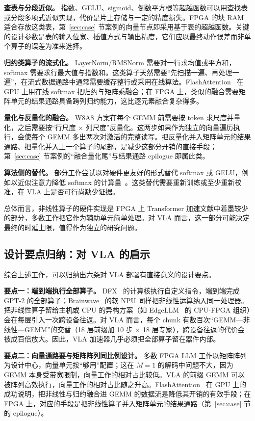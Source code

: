 \documentclass[a4paper,10.5pt]{ctexart}
\begin{document}
\textbf{查表与分段近似。} 指数、GELU、sigmoid、倒数平方根等超越函数可以用查找表或分段多项式近似实现，代价是片上存储与一定的精度损失。FPGA 的块 RAM 适合存放这类表，第~\ref{sec:case} 节案例的向量节点即采用基于表的超越函数。关键的设计参数是表的输入位宽、插值方式与输出精度，它们应以最终动作误差而非单个算子的误差为准来选择。

\textbf{归约类算子的流式化。} LayerNorm/RMSNorm 需要对一行求均值或平方和，softmax 需要求行最大值与指数和。这类算子天然需要“先扫描一遍、再处理一遍”，在流式数据通路中通常需要缓存整行或采用在线算法。FlashAttention~\cite{flashattn} 在 GPU 上用在线 softmax 把归约与矩阵乘融合；在 FPGA 上，类似的融合需要矩阵单元的结果通路具备跨列归约能力，这比逐元素融合复杂得多。

\textbf{量化与反量化的融合。} W8A8 方案在每个 GEMM 前需要按 token 求尺度并量化，之后需要按“行尺度 $\times$ 列尺度”反量化。这两步如果作为独立的向量遍历执行，会使每个 GEMM 多出两次对激活的完整读写。把反量化并入矩阵单元的结果通路、把量化并入上一个算子的尾部，是减少这部分开销的直接手段；第~\ref{sec:case} 节案例的“融合量化尾”与结果通路 epilogue 即属此类。

\textbf{算法侧的替代。} 部分工作尝试以对硬件更友好的形式替代 softmax 或 GELU，例如以近似注意力降低 softmax 的计算量~\cite{a3,elsa}。这类替代需要重新训练或至少重新校准，在 VLA 上是否可行尚缺少证据。

总体而言，非线性算子的硬件实现是 FPGA 上 Transformer 加速文献中着墨较少的部分，多数工作把它作为辅助单元简单处理。对 VLA 而言，这一部分可能决定最终的时延上限，值得作为独立的研究问题。

\subsection{设计要点归纳：对 VLA 的启示}\label{sec:lessons}

综合上述工作，可以归纳出六条对 VLA 部署有直接意义的设计要点。

\textbf{要点一：端到端执行全部算子。} DFX~\cite{dfx} 的计算核执行自定义指令，端到端完成 GPT-2 的全部算子；Brainwave~\cite{brainwave} 的软 NPU 同样把非线性运算纳入同一处理器。把非线性算子留给主机或 CPU 的异构方案（如 EdgeLLM~\cite{edgellm} 的 CPU-FPGA 组织）会在每层引入一次跨设备往返。对 VLA 而言，每个 chunk 有数百次“GEMM—非线性—GEMM”的交替（18 层前缀加 10 步 $\times$ 18 层专家），跨设备往返的代价会被成百倍放大。因此，VLA 加速器几乎必须把全部算子留在器件内部。

\textbf{要点二：向量通路要与矩阵阵列同比例设计。} 多数 FPGA LLM 工作以矩阵阵列为设计中心，向量单元按“够用”配置；这在 $M=1$ 的解码中问题不大，因为 GEMM 本身受带宽限制，向量工作的相对占比较低。VLA 的前缀 GEMM 可以被阵列高效执行，向量工作的相对占比随之升高。FlashAttention~\cite{flashattn} 在 GPU 上的成功说明，把非线性与归约融合进 GEMM 的数据流是降低其开销的有效手段；在 FPGA 上，对应的手段是把非线性算子并入矩阵单元的结果通路（第~\ref{sec:case} 节的 epilogue）。
\end{document}
